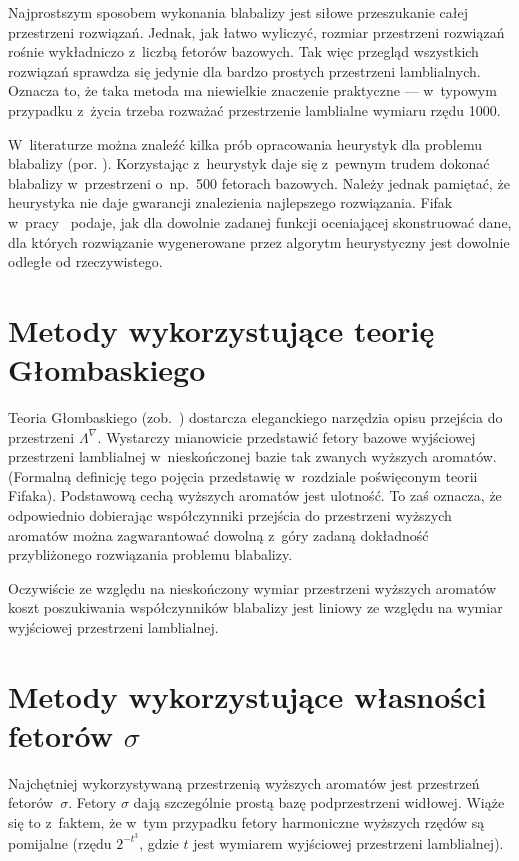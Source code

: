 \documentclass[licencjacka,en]{pracamgr}
\begin{document}
Najprostszym sposobem wykonania blabalizy jest siłowe przeszukanie
całej przestrzeni rozwiązań.  Jednak, jak łatwo wyliczyć, rozmiar
przestrzeni rozwiązań rośnie wykładniczo z~liczbą fetorów bazowych.
Tak więc przegląd wszystkich rozwiązań sprawdza się jedynie dla bardzo
prostych przestrzeni lamblialnych.  Oznacza to, że taka metoda ma
niewielkie znaczenie praktyczne --- w~typowym przypadku z~życia trzeba
rozważać przestrzenie lamblialne wymiaru rzędu 1000.

W~literaturze można znaleźć kilka prób opracowania heurystyk dla
problemu blabalizy (por. \cite{heu}).  Korzystając z~heurystyk daje
się z~pewnym trudem dokonać blabalizy w~przestrzeni o~np.~500 fetorach
bazowych.  Należy jednak pamiętać, że heurystyka nie daje gwarancji
znalezienia najlepszego rozwiązania.  Fifak w~pracy~\cite{ff-sr}
podaje, jak dla dowolnie zadanej funkcji oceniającej skonstruować
dane, dla których rozwiązanie wygenerowane przez algorytm heurystyczny
jest dowolnie odległe od rzeczywistego.

\section{Metody wykorzystujące teorię Głombaskiego}

Teoria Głombaskiego (zob.~\cite{grglo}) dostarcza eleganckiego
narzędzia opisu przejścia do przestrzeni $\Lambda^{\nabla}$.
Wystarczy mianowicie przedstawić fetory bazowe wyjściowej przestrzeni
lamblialnej w~nieskończonej bazie tak zwanych wyższych aromatów.
(Formalną definicję tego pojęcia przedstawię w~rozdziale poświęconym
teorii Fifaka).  Podstawową cechą wyższych aromatów jest ulotność.  To
zaś oznacza, że odpowiednio dobierając współczynniki przejścia do
przestrzeni wyższych aromatów można zagwarantować dowolną z~góry
zadaną dokładność przybliżonego rozwiązania problemu blabalizy.

Oczywiście ze względu na nieskończony wymiar przestrzeni wyższych
aromatów koszt poszukiwania współczynników blabalizy jest liniowy ze
względu na wymiar wyjściowej przestrzeni lamblialnej.

\section{Metody wykorzystujące własności fetorów $\sigma$}

Najchętniej wykorzystywaną przestrzenią wyższych aromatów jest
przestrzeń fetorów~$\sigma$.  Fetory $\sigma$ dają szczególnie prostą
bazę podprzestrzeni widłowej.  Wiąże się to z~faktem, że w~tym przypadku
fetory harmoniczne wyższych rzędów są pomijalne (rzędu $2^{-t^3}$,
gdzie $t$ jest wymiarem wyjściowej przestrzeni lamblialnej).
\end{document}
